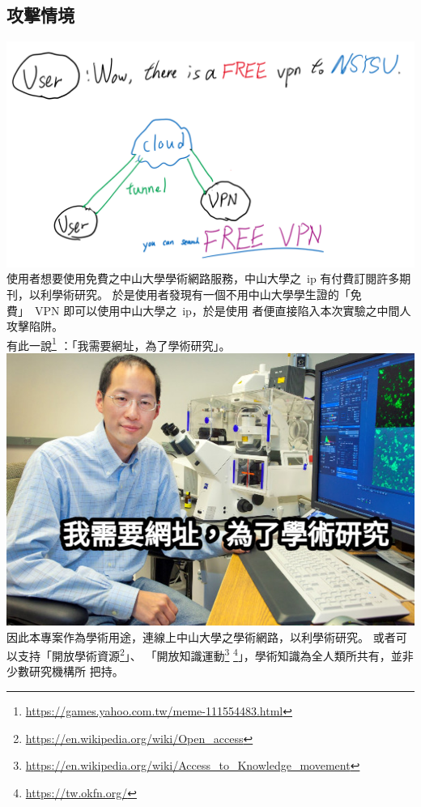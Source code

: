 \documentclass[a4paper]{article}
\begin{document}
\begin{CJK*}{UTF8}{bsmi}
    \subsection{攻擊情境}
    \includegraphics[width=\textwidth]{images/image_2022-01-14_01-42-43.png}\\

    使用者想要使用免費之中山大學學術網路服務，中山大學之\ ip 有付費訂閱許多期刊，以利學術研究。
    於是使用者發現有一個不用中山大學學生證的「免費」\ VPN 即可以使用中山大學之\ ip，於是使用
    者便直接陷入本次實驗之中間人攻擊陷阱。\\

    有此一說\footnote{\url{https://games.yahoo.com.tw/meme-111554483.html}}
    ：「我需要網址，為了學術研究」。\\
    \includegraphics[width=\textwidth]{images/1613538663684.jpg}
    因此本專案作為學術用途，連線上中山大學之學術網路，以利學術研究。
    或者可以支持「開放學術資源\footnote{\url{https://en.wikipedia.org/wiki/Open_access}}」、
    「開放知識運動\footnote{\url{https://en.wikipedia.org/wiki/Access_to_Knowledge_movement}}
    \footnote{\url{https://tw.okfn.org/}}」，學術知識為全人類所共有，並非少數研究機構所
    把持。


\end{CJK*}
\end{document}
